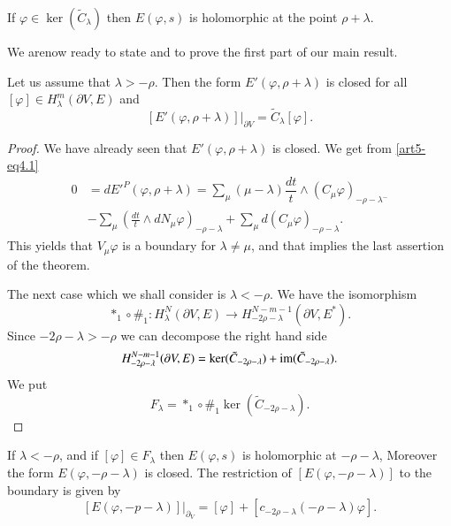\begin{lemma}\label{art5-lem4.5}
If $\varphi \in \ker (\tilde{C}_\lambda)$ then $E(\varphi, s)$ is holomorphic at the point $\rho + \lambda$.
\end{lemma}

We are\pageoriginale now ready to state and to prove the first part of our main result.

\setcounter{subsection}{6}
\begin{subtheorem}\label{art5-subthm4.6.1}
Let us assume that $\lambda > - \rho$. Then the form $E' (\varphi, \rho + \lambda)$ is closed for all $[\varphi] \in H^m_\lambda (\partial V, E)$ and 
$$
[E' (\varphi , \rho + \lambda)] |_{\partial V} = \tilde{C}_\lambda [\varphi].
$$
\end{subtheorem}

\begin{proof}
We have already seen that $E'(\varphi, \rho +\lambda)$ is closed. We get from \eqref{art5-eq4.1}
\begin{align*}
0  & = dE'^P (\varphi , \rho + \lambda) = \sum\limits_\mu (\mu - \lambda) \dfrac{dt}{t} \wedge (C_\mu \varphi)_{- \rho - \lambda^-}\\
& - \sum\limits_\mu \left(\frac{dt}{t} \wedge d N_{\mu} \varphi \right)_{-\rho - \lambda} + \sum\limits_\mu d (C_\mu \varphi)_{-\rho - \lambda}.
\end{align*}
This yields that $V_\mu \varphi$ is a boundary for $\lambda \neq \mu$, and that implies the last assertion of the theorem.

The next case which we shall consider is $\lambda < - \rho$. We have the isomorphism
$$
\ast_1 \circ \#_1: H^N_\lambda  (\partial V, E) \longrightarrow H^{N-m-1}_{-2\rho -\lambda} (\partial V, E^\ast).
$$
Since $-2 \rho - \lambda > -\rho$  we can decompose the right hand side 
$$
H^{N - m -1}_{-2 \rho -\lambda} (\partial V, E) = \ker (\tilde{C}_{-2\rho - \lambda}) + \operatorname{im} (\tilde{C}_{-2\rho -\lambda}).
$$
We put 
$$
F_\lambda = \ast_1 \circ \#_1 \ker (\tilde{C}_{-2\rho -\lambda}).
$$
\end{proof}

\begin{subtheorem}\label{art5-subthm4.6.2}
If $\lambda < - \rho$, and if $[\varphi] \in F_\lambda$ then $E(\varphi, s)$ is holomorphic at $- \rho -\lambda$, Moreover the form $E (\varphi, - \rho - \lambda)$ is closed. The restriction of $[E (\varphi, -\rho - \lambda)]$ to the boundary is given by
$$
[E(\varphi, - p - \lambda)] |_{\partial_V} = [\varphi] + [c_{-2\rho -\lambda} (-\rho - \lambda) \varphi].
$$
\end{subtheorem}

